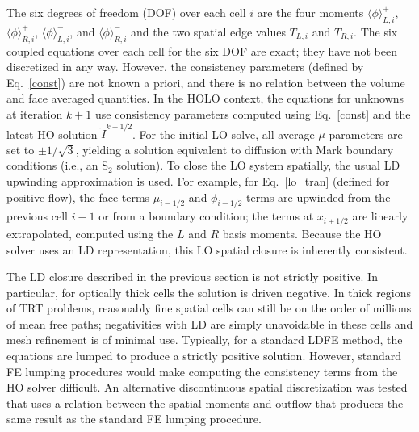 \documentclass{mc2013}
\newcommand{\mom}[1]{\langle #1 \rangle}
\begin{document}

The six degrees of freedom (DOF) over each cell $i$ are the four moments $\mom{\phi}_{L,i}^+$,
$\mom{\phi}_{R,i}^+$, $\mom{\phi}_{L,i}^-$, and $\mom{\phi}_{R,i}^-$ and the two
spatial edge values $T_{L,i}$ and $T_{R,i}$. The six coupled equations over each cell for the six DOF are exact; they have not been discretized
in any way.  However, the consistency parameters (defined by Eq.~\eqref{const}) are not known a priori, and
there is no relation between the volume and face averaged quantities.  In the HOLO
context, the equations for unknowns at iteration $k+1$ use consistency parameters
computed using Eq.~\eqref{const} and the latest HO solution $\tilde{I}^{k+1/2}$. For the initial LO
solve, all average $\mu$ parameters are
set to $\pm 1/\sqrt{3}$, yielding a solution equivalent to diffusion
with Mark boundary conditions (i.e., an S$_2$ solution).  To close the LO system spatially, the usual LD upwinding
approximation is used.  For example, for Eq.~\eqref{lo_tran} (defined for positive flow), the face terms $\mu_{i-1/2}$ and $\phi_{i-1/2}$
terms are upwinded from the previous cell $i-1$ or from a boundary condition; the terms
at $x_{i+1/2}$ are linearly extrapolated, computed using the $L$ and $R$ basis moments.
Because the HO
solver uses an LD representation, this LO spatial closure is inherently
consistent.  


The LD closure described in the previous section is not strictly positive.  In particular, for
optically thick cells the solution is driven negative.  In thick regions of
TRT problems, reasonably fine spatial cells can still be on the order of millions of mean
free paths; negativities with LD are simply unavoidable in these cells and mesh
refinement is of minimal use.  Typically, for a standard LDFE method,
the equations are lumped to produce a strictly positive solution. However, standard FE lumping
procedures would make computing the consistency terms from the HO solver difficult. 
An alternative discontinuous spatial discretization was tested that uses a relation between the
spatial moments and outflow that produces the same result as the
standard FE lumping procedure. 
\end{document}
